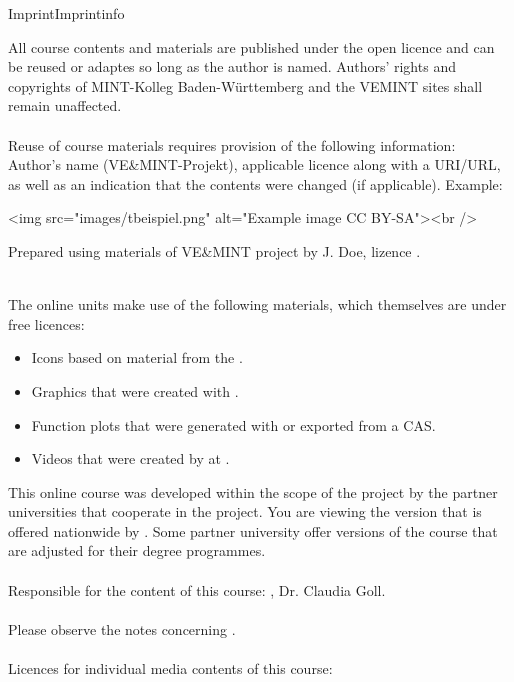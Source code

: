 \begin{MXContent}{Imprint}{Imprint}{info}

All course contents and materials are published under the open licence 
and can be reused or adaptes so long as the author is named.
Authors' rights and copyrights of MINT-Kolleg Baden-Württemberg and
the VEMINT sites shall remain unaffected.
\ \\ \ \\
Reuse of course materials requires provision of the following information: Author's name (VE\&MINT-Projekt), applicable licence along with a URI/URL,
as well as an indication that the contents were changed (if applicable). Example:

\begin{center}
\begin{html}
<img src="images/tbeispiel.png" alt="Example image CC BY-SA"><br />
\end{html}
Prepared using materials of VE\&MINT project by J. Doe, lizence .
\end{center}
\ \\

The online units make use of the following materials, which themselves are under free licences:
\begin{itemize}
\item{Icons based on material from the .}
\item{Graphics that were created with .}
\item{Function plots that were generated with  or exported from a CAS.}
\item{Videos that were created by  at .}
\end{itemize}

This online course was developed within the scope of the  project by the partner universities that cooperate in the project.
You are viewing the version that is offered nationwide by .
Some partner university offer versions of the course that are adjusted for their degree programmes.
\ \\ \ \\
Responsible for the content of this course: , Dr. Claudia Goll. 
\ \\ \ \\
Please observe the notes concerning .
\ \\ \ \\
Licences for individual media contents of this course:\ \\
\MCopyrightCollection




\end{MXContent}
